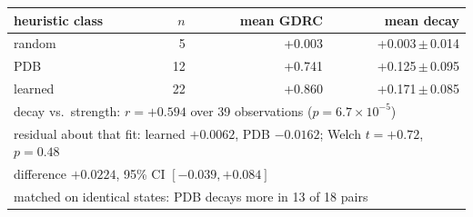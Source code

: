 \begin{tabular}{lrrr}
\toprule
heuristic class & $n$ & mean GDRC & mean decay \\
\midrule
random & 5 & +0.003 & +0.003\,$\pm$\,0.014 \\
PDB & 12 & +0.741 & +0.125\,$\pm$\,0.095 \\
learned & 22 & +0.860 & +0.171\,$\pm$\,0.085 \\
\midrule
\multicolumn{4}{l}{decay vs.\ strength: $r = +0.594$ over 39 observations ($p = 6.7\!\times\!10^{-5}$)} \\
\multicolumn{4}{l}{residual about that fit: learned $+0.0062$, PDB $-0.0162$; Welch $t = +0.72$, $p = 0.48$} \\
\multicolumn{4}{l}{\quad difference $+0.0224$, 95\% CI $[-0.039, +0.084]$} \\
\multicolumn{4}{l}{matched on identical states: PDB decays more in 13 of 18 pairs} \\
\bottomrule
\end{tabular}